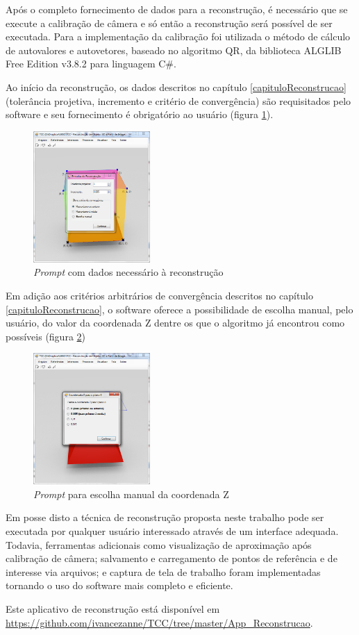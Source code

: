 		Após o completo fornecimento de dados para a reconstrução, é necessário que se execute a calibração de câmera e só então a reconstrução será possível de ser executada. Para a implementação da calibração foi utilizada o método de cálculo de autovalores e autovetores, baseado no algoritmo QR, da biblioteca ALGLIB Free Edition v3.8.2 para linguagem C\#.
		
		Ao início da reconstrução, os dados descritos no capítulo \ref{capituloReconstrucao} (tolerância projetiva, incremento e critério de convergência) são requisitados pelo software e seu fornecimento é obrigatório ao usuário (figura \ref{printAppReconstrucaoReconstrucao}).
		
		\begin{figure}[!htb]
			\centering
			\includegraphics[height=5cm]{imagens/printAppReconstrucaoReconstrucao.png}
			\caption{\textit{Prompt} com dados necessário à reconstrução}
			\label{printAppReconstrucaoReconstrucao}
		\end{figure}
		
		Em adição aos critérios arbitrários de convergência descritos no capítulo \ref{capituloReconstrucao}, o software oferece a possibilidade de escolha manual, pelo usuário, do valor da coordenada Z dentre os que o algoritmo já encontrou como possíveis (figura \ref{printAppReconstrucaoEscolhaManual})
		
		\begin{figure}[!htb]
			\centering
			\includegraphics[height=5cm]{imagens/printAppReconstrucaoEscolhaManual.png}
			\caption{\textit{Prompt} para escolha manual da coordenada Z}
			\label{printAppReconstrucaoEscolhaManual}
		\end{figure}
		
		Em posse disto a técnica de reconstrução proposta neste trabalho pode ser executada por qualquer usuário interessado através de um interface adequada. Todavia, ferramentas adicionais como visualização de aproximação após calibração de câmera; salvamento e carregamento de pontos de referência e de interesse via arquivos; e captura de tela de trabalho foram implementadas tornando o uso do software mais completo e eficiente.
		
		Este aplicativo de reconstrução está disponível em \url{https://github.com/ivancezanne/TCC/tree/master/App_Reconstrucao}.
		